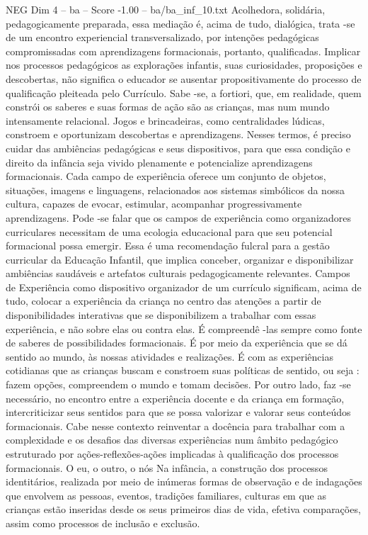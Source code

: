 \begin{textsample}{NEG Dim 4 – ba – Score -1.00 – ba/ba\_inf\_10.txt}
Acolhedora, solidária, pedagogicamente preparada, essa mediação é, acima de tudo, dialógica, trata -se de um encontro experiencial transversalizado, por intenções pedagógicas compromissadas com aprendizagens formacionais, portanto, qualificadas.
Implicar nos processos pedagógicos as explorações infantis, suas curiosidades, proposições e descobertas, não significa o educador se ausentar propositivamente do processo de qualificação pleiteada pelo Currículo.
Sabe -se, a fortiori, que, em realidade, quem constrói os saberes e suas formas de ação são as crianças, mas num mundo intensamente relacional.
Jogos e brincadeiras, como centralidades lúdicas, constroem e oportunizam descobertas e aprendizagens.
Nesses termos, é preciso cuidar das ambiências pedagógicas e seus dispositivos, para que essa condição e direito da infância seja vivido plenamente e potencialize aprendizagens formacionais.
Cada campo de experiência oferece um conjunto de objetos, situações, imagens e linguagens, relacionados aos sistemas simbólicos da nossa cultura, capazes de evocar, estimular, acompanhar progressivamente aprendizagens.
Pode -se falar que os campos de experiência como organizadores curriculares necessitam de uma ecologia educacional para que seu potencial formacional possa emergir.
Essa é uma recomendação fulcral para a gestão curricular da Educação Infantil, que implica conceber, organizar e disponibilizar ambiências saudáveis e artefatos culturais pedagogicamente relevantes.
Campos de Experiência como dispositivo organizador de um currículo significam, acima de tudo, colocar a experiência da criança no centro das atenções a partir de disponibilidades interativas que se disponibilizem a trabalhar com essas experiência, e não sobre elas ou contra elas.
É compreendê -las sempre como fonte de saberes de possibilidades formacionais.
É por meio da experiência que se dá sentido ao mundo, às nossas atividades e realizações.
É com as experiências cotidianas que as crianças buscam e constroem suas políticas de sentido, ou seja : fazem opções, compreendem o mundo e tomam decisões.
Por outro lado, faz -se necessário, no encontro entre a experiência docente e da criança em formação, intercriticizar seus sentidos para que se possa valorizar e valorar seus conteúdos formacionais.
Cabe nesse contexto reinventar a docência para trabalhar com a complexidade e os desafios das diversas experiências num âmbito pedagógico estruturado por ações-reflexões-ações implicadas à qualificação dos processos formacionais.
O eu, o outro, o nós Na infância, a construção dos processos identitários, realizada por meio de inúmeras formas de observação e de indagações que envolvem as pessoas, eventos, tradições familiares, culturas em que as crianças estão inseridas desde os seus primeiros dias de vida, efetiva comparações, assim como processos de inclusão e exclusão.

\end{textsample}
